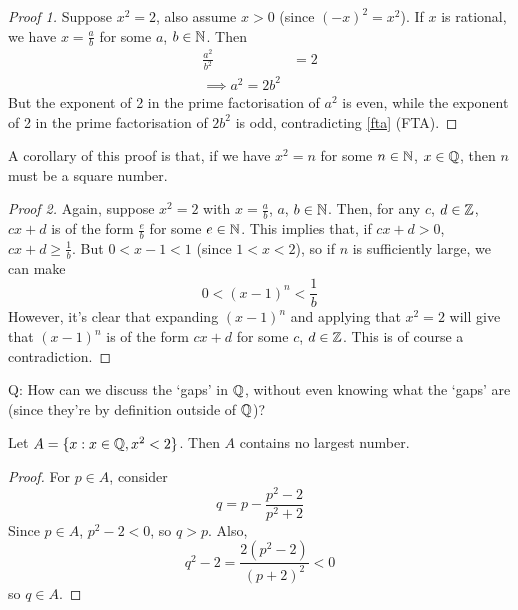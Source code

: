 \documentclass{../../template/note}
\begin{document}
    \begin{proof}[Proof 1]
        Suppose \(x^2 = 2\), also assume \(x > 0\) (since \((-x)^2 = x^2\)). If \(x\) is rational, we have \(x = \frac{a}{b}\) for some \(a\), \(b \in \mathbb N\). Then
        \begin{align*}
            \frac{a^2}{b^2} &= 2 \\
            \implies a^2 = 2b^2
        \end{align*}
        But the exponent of 2 in the prime factorisation of \(a^2\) is even, while the exponent of 2 in the prime factorisation of \(2b^2\) is odd, contradicting \cref{fta} (FTA).        
    \end{proof}
    
    \begin{remark*}
        A corollary of this proof is that, if we have \(x^2 = n\) for some \(n \in \mathbb N\), \(x \in \mathbb Q\), then \(n\) must be a square number.
    \end{remark*}
    
    \begin{proof}[Proof 2]
        Again, suppose \(x^2 = 2\) with \(x = \frac{a}{b}\), \(a\), \(b \in \mathbb N\). Then, for any \(c\), \(d \in \mathbb Z\), \(cx + d\) is of the form \(\frac{e}{b}\) for some \(e \in \mathbb N\). This implies that, if \(cx + d > 0\), \(cx + d \geq \frac{1}{b}\). But \(0 < x-1 < 1\) (since \(1 < x < 2\)), so if \(n\) is sufficiently large, we can make
        \[  
            0 < (x-1)^n < \frac{1}{b}
        \]
        However, it's clear that expanding \((x-1)^n\) and applying that \(x^2 = 2\) will give that \((x-1)^n\) is of the form \(cx + d\) for some \(c\), \(d \in \mathbb Z\). This is of course a contradiction.
    \end{proof}
    
    Q: How can we discuss the `gaps' in \(\mathbb Q\), without even knowing what the `gaps' are (since they're by definition outside of \(\mathbb Q\))?
    
    \begin{proposition}
        Let \(A = \{x: x \in \mathbb Q, x^2 < 2\}\). Then \(A\) contains no largest number.
    \end{proposition}

    \begin{proof}
        For \(p \in A\), consider
        \[
            q = p - \frac{p^2-2}{p^2+2}
        \]
        Since \(p \in A\), \(p^2 - 2 < 0\), so \(q > p\). Also,
        \[
            q^2-2 = \frac{2(p^2-2)}{(p+2)^2} < 0
        \]
        so \(q \in A\).
    \end{proof}
    
\end{document}
